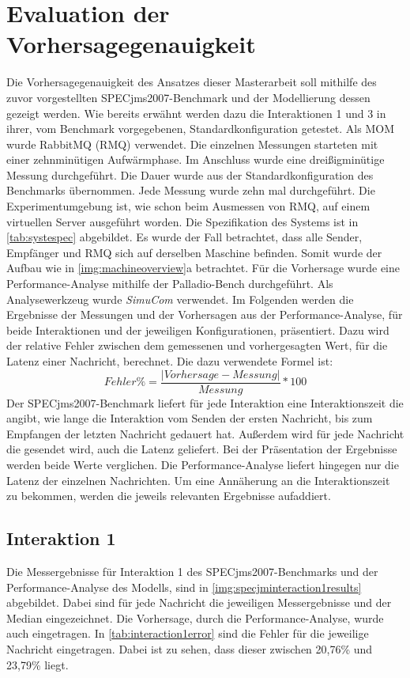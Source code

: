 \section{Evaluation der Vorhersagegenauigkeit}
\label{sec:specjmsmodellvorhersage}
Die Vorhersagegenauigkeit des Ansatzes dieser Masterarbeit soll mithilfe des zuvor vorgestellten SPECjms2007-Benchmark und der Modellierung dessen gezeigt werden. Wie bereits erwähnt werden dazu die Interaktionen 1 und 3 in ihrer, vom Benchmark vorgegebenen, Standardkonfiguration getestet. Als MOM wurde RabbitMQ (RMQ) verwendet. Die einzelnen Messungen starteten mit einer zehnminütigen Aufwärmphase. Im Anschluss wurde eine dreißigminütige Messung durchgeführt. Die Dauer wurde aus der Standardkonfiguration des Benchmarks übernommen. Jede Messung wurde zehn mal durchgeführt. Die Experimentumgebung ist, wie schon beim Ausmessen von RMQ, auf einem virtuellen Server ausgeführt worden. Die Spezifikation des Systems ist in \autoref{tab:systespec} abgebildet. Es wurde der Fall betrachtet, dass alle Sender, Empfänger und RMQ sich auf derselben Maschine befinden. Somit wurde der Aufbau wie in \autoref{img:machineoverview}a betrachtet. Für die Vorhersage wurde eine Performance-Analyse mithilfe der Palladio-Bench durchgeführt. Als Analysewerkzeug wurde \emph{SimuCom} verwendet. Im Folgenden werden die Ergebnisse der Messungen und der Vorhersagen aus der Performance-Analyse, für beide Interaktionen und der jeweiligen Konfigurationen, präsentiert. Dazu wird der relative Fehler zwischen dem gemessenen und vorhergesagten Wert, für die Latenz einer Nachricht, berechnet. Die dazu verwendete Formel ist:
\[ Fehler\% = \frac{|Vorhersage - Messung|}{Messung} * 100 \]
Der SPECjms2007-Benchmark liefert für jede Interaktion eine Interaktionszeit die angibt, wie lange die Interaktion vom Senden der ersten Nachricht, bis zum Empfangen der letzten Nachricht gedauert hat. Außerdem wird für jede Nachricht die gesendet wird, auch die Latenz geliefert. Bei der Präsentation der Ergebnisse werden beide Werte verglichen. Die Performance-Analyse liefert hingegen nur die Latenz der einzelnen Nachrichten. Um eine Annäherung an die Interaktionszeit zu bekommen, werden die jeweils relevanten Ergebnisse aufaddiert.
\subsection{Interaktion 1}
Die Messergebnisse für Interaktion 1 des SPECjms2007-Benchmarks und der Perfor\-mance-Analyse des Modells, sind in \autoref{img:specjminteraction1results} abgebildet. Dabei sind für jede Nachricht die jeweiligen Messergebnisse und der Median eingezeichnet. Die Vorhersage, durch die Performance-Analyse, wurde auch eingetragen. In \autoref{tab:interaction1error} sind die Fehler für die jeweilige Nachricht eingetragen. Dabei ist zu sehen, dass dieser zwischen 20,76\% und 23,79\% liegt. 


